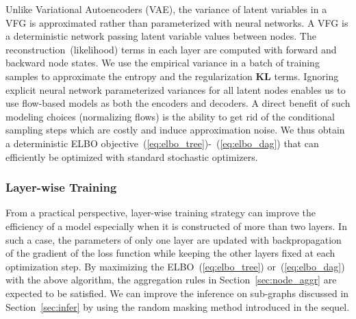 \documentclass[twoside]{article}
\begin{document}
Unlike Variational Autoencoders (VAE), the variance of latent variables in a VFG is approximated rather than parameterized with neural networks. 
A VFG is a deterministic network passing latent variable values between nodes. 
The reconstruction~(likelihood) terms in each layer are computed with forward and backward node states. 
We use the empirical variance in a batch of training samples to approximate the entropy and the regularization \textbf{KL} terms. 
Ignoring explicit neural network parameterized variances for all latent nodes enables us to use flow-based models as both the encoders and decoders. 
A direct benefit of such modeling choices (normalizing flows) is the ability to get rid of the conditional sampling steps which are costly and induce approximation noise. 
We thus obtain a deterministic ELBO objective~(\ref{eq:elbo_tree})-~(\ref{eq:elbo_dag}) that can efficiently be optimized with standard stochastic optimizers. 

\subsubsection{Layer-wise Training}
From a practical perspective, layer-wise training strategy can improve the efficiency of a model especially when it is constructed of more than two layers. 
In such a case, the parameters of only one layer are updated with backpropagation of the gradient of the loss function while keeping the other layers fixed at each optimization step. 
By maximizing the ELBO~(\ref{eq:elbo_tree}) or~(\ref{eq:elbo_dag}) with the above algorithm, the aggregation rules in Section~\ref{sec:node_aggr} are expected to be satisfied. 
We can improve the inference on sub-graphs discussed in Section~\ref{sec:infer} by using the random masking method introduced in the sequel.
\end{document}
